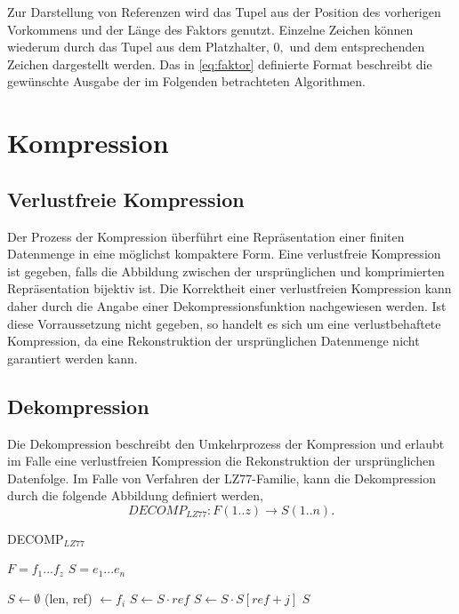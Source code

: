 Zur Darstellung von Referenzen wird das Tupel aus der Position des vorherigen Vorkommens und der Länge des Faktors genutzt. Einzelne Zeichen können wiederum durch das Tupel aus dem 
Platzhalter, $0,$ und dem entsprechenden Zeichen dargestellt werden. Das in \ref{eq:faktor} definierte Format beschreibt die gewünschte Ausgabe der im Folgenden betrachteten Algorithmen.

\section{Kompression} \label{comp}

\subsection{Verlustfreie Kompression}
Der Prozess der Kompression überführt eine Repräsentation einer finiten Datenmenge in eine möglichst kompaktere Form. Eine verlustfreie Kompression ist gegeben, falls die Abbildung
zwischen der ursprünglichen und komprimierten Repräsentation bijektiv ist. Die Korrektheit einer verlustfreien Kompression kann daher durch die Angabe einer Dekompressionsfunktion 
nachgewiesen werden. Ist diese Vorraussetzung nicht gegeben, so handelt es sich um eine verlustbehaftete Kompression, da eine Rekonstruktion der ursprünglichen Datenmenge nicht 
garantiert werden kann.

\subsection{Dekompression}
Die Dekompression beschreibt den Umkehrprozess der Kompression und erlaubt im Falle eine verlustfreien Kompression die Rekonstruktion der ursprünglichen Datenfolge. Im Falle von 
Verfahren der LZ77-Familie, kann die Dekompression durch die folgende Abbildung definiert werden, 
\begin{equation}
    DECOMP_{LZ77}: F(1..z) \rightarrow S(1..n).
\end{equation}

\begin{algorithm} [ht]
\centering
\caption{DECOMP$_{LZ77}$} \label{alg:decomp}
\algorithmicrequire $F=f_1...f_z$
\algorithmicensure $S=e_1...e_n$
\begin{algorithmic} [1]
    \STATE $S \gets \emptyset$
        \STATE (len, ref) $\gets f_i$
            \STATE $S \gets S \cdot ref$
        \ELSE
                \STATE $S \gets S \cdot S[ref + j]$
            \ENDFOR
        \ENDIF
    \ENDFOR
    \RETURN $S$
\end{algorithmic}
\end{algorithm}

